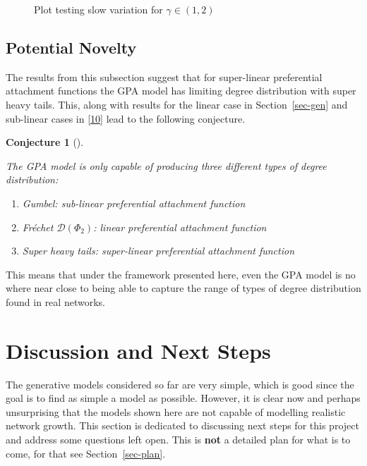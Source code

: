 \documentclass[
  10pt,
  a4paper,
]{scrreprt}
\providecommand{\tightlist}{%
  \setlength{\itemsep}{0pt}\setlength{\parskip}{0pt}}\usepackage{longtable,booktabs,array}
\theoremstyle{definition}
\theoremstyle{plain}
\theoremstyle{plain}
\theoremstyle{plain}
\newtheorem{conjecture}{Conjecture}[section]
\theoremstyle{remark}
\begin{document}
{\begin{figure}[H]
{}

\caption{\label{fig-shtail}Plot testing slow variation for
\(\gamma \in (1,2)\)}

\end{figure}

\hypertarget{potential-novelty}{%
\section{Potential Novelty}\label{potential-novelty}}

The results from this subsection suggest that for super-linear
preferential attachment functions the GPA model has limiting degree
distribution with super heavy tails. This, along with results for the
linear case in Section~\ref{sec-gen} and sub-linear cases in
{[}\protect\hyperlink{ref-barabasibook}{10}{]} lead to the following
conjecture.

\begin{conjecture}[]\protect\hypertarget{cnj-gpa}{}\label{cnj-gpa}

The GPA model is only capable of producing three different types of
degree distribution:

\begin{enumerate}
\def\labelenumi{\arabic{enumi}.}
\tightlist
\item
  Gumbel: sub-linear preferential attachment function
\item
  Fréchet \(\mathcal D(\Phi_2)\): linear preferential attachment
  function
\item
  Super heavy tails: super-linear preferential attachment function
\end{enumerate}

\end{conjecture}

This means that under the framework presented here, even the GPA model
is no where near close to being able to capture the range of types of
degree distribution found in real networks.

\hypertarget{discussion-and-next-steps}{%
\chapter{Discussion and Next Steps}\label{discussion-and-next-steps}}

The generative models considered so far are very simple, which is good
since the goal is to find as simple a model as possible. However, it is
clear now and perhaps unsurprising that the models shown here are not
capable of modelling realistic network growth. This section is dedicated
to discussing next steps for this project and address some questions
left open. This is \textbf{not} a detailed plan for what is to come, for
that see Section~\ref{sec-plan}.

}
\end{document}
